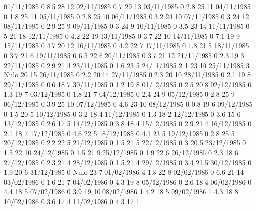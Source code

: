 01/11/1985  0      8.5    28     12 
02/11/1985  0      7      29     13 
03/11/1985  0      2.8    25     11 
04/11/1985  0      1.8    25     11 
05/11/1985  0      2.8    25     10 
06/11/1985  0      3.2    24     10 
07/11/1985  0      3      24     12 
08/11/1985  0      2.9    25     9 
09/11/1985  0      3      24     9 
10/11/1985  0      3.5    23     14 
11/11/1985  0      5      21     18 
12/11/1985  0      4.2    22     19 
13/11/1985  0      3.7    22     10 
14/11/1985  0      7.1    19     9 
15/11/1985  0      4.7    20     12 
16/11/1985  0      4.2    22     7 
17/11/1985  0      1.8    21     5 
18/11/1985  0      3.7    21     6 
19/11/1985  0      6.5    22     6 
20/11/1985  0      3.7    21     12 
21/11/1985  0      2.3    19     3 
22/11/1985  0      2.9    21     4 
23/11/1985  0      1.6    23     5 
24/11/1985  2      1      23     10 
25/11/1985  3     Nulo    20     15 
26/11/1985  0      2.2    20     14 
27/11/1985  0      2.3    20     10 
28/11/1985  0      2.1    19     8 
29/11/1985  0      0.6    18     7 
30/11/1985  0      1.2    19     8 
01/12/1985  0      2.5    20     8 
02/12/1985  0      1.3    19     7 
03/12/1985  0      1.8    21     7 
04/12/1985  0      2.4    24     9 
05/12/1985  0      2.8    25     9 
06/12/1985  0      3.9    25     10 
07/12/1985  0      4.6    23     10 
08/12/1985  0      0.8    19     6 
09/12/1985  0      1.5    20     5 
10/12/1985  0      3.2    18     4 
11/12/1985  0      1.3    18     2 
12/12/1985  0      3.6    15     6 
13/12/1985  0      2.6    17     5 
14/12/1985  0      3.8    18     4 
15/12/1985  0      2.9    21     4 
16/12/1985  0      2.1    18     7 
17/12/1985  0      4.6    22     5 
18/12/1985  0      4.1    23     5 
19/12/1985  0      2.8    25     5 
20/12/1985  0      2.2    22     5 
21/12/1985  0      1.5    21     5 
22/12/1985  0      3      20     5 
23/12/1985  0      1.5    22     10 
24/12/1985  0      1.5    21     9 
25/12/1985  0      1.9    22     6 
26/12/1985  0      2.3    18     6 
27/12/1985  0      2.3    21     4 
28/12/1985  0      1.5    21     4 
29/12/1985  0      3.4    21     5 
30/12/1985  0      1.9    20     6 
31/12/1985  0     Nulo    23     7 
01/02/1986  4      1.8    22     8 
02/02/1986  0      6.6    21     14 
03/02/1986  0      1.6    21     7 
04/02/1986  0      4.3    19     8 
05/02/1986  0      2.6    18     4 
06/02/1986  0      4.4    18     5 
07/02/1986  0      3.9    19     10 
08/02/1986  1      4.2    18     5 
09/02/1986  1      4.3    18     8 
10/02/1986  0      3.6    17     4 
11/02/1986  0      4.3    17     1 

